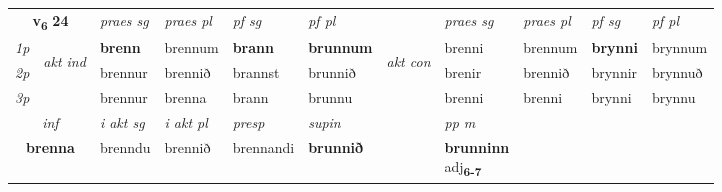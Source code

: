 \noindent
\begin{tabular}{lllllllllll} \toprule
\multicolumn{2}{c}{\textbf{v{\textsubscript{6}}} \Large{\textbf{24}}}  &  \textit{praes sg}  & \textit{praes pl}  &\textit{ pf sg} & \textit{pf pl} &  &  \textit{praes sg}  & \textit{praes pl}  & \textit{pf sg} & \textit{pf pl } \\*
	\cmidrule{3-6} \cmidrule{8-11}
 {\textit{1p}} & \multirow{3}{*}{\begin{turn}{90}\textit{akt ind}\end{turn}} & \textbf{brenn} & brennum & \textbf{brann} & \textbf{brunnum} & \multirow{3}{*}{\begin{turn}{90}\textit{akt con}\end{turn}} &brenni & brennum & \textbf{brynni} & brynnum\\*
 {\textit{2p}} &  &  brennur  & brennið & brannst & brunnið & & brenir & brennið & brynnir & brynnuð \\*
{\textit{3p}} &  & brennur & brenna & brann & brunnu & & brenni & brenni& brynni & brynnu \\*
\cmidrule{3-6} \cmidrule{8-11}

   \multicolumn{2}{c}{\textit{inf}}  & \textit{i akt sg} & \textit{i akt pl}   & \textit{presp} & \textit{supin}  && \textit{pp m} \\*
  \multicolumn{2}{c}{\textbf{brenna}} & brenndu  & brennið   & brennandi &  \textbf{brunnið}  && \specialcell{\textbf{brunninn} \\ adj\textbf{\textsubscript{6-7}}} \\*
\end{tabular}

